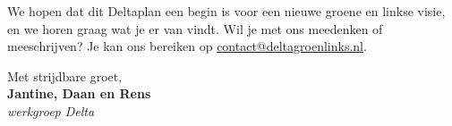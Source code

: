 \begin{multicols}{2}
We hopen dat dit Deltaplan een begin is voor een nieuwe groene en linkse visie, en we horen graag wat je er van vindt.
Wil je met ons meedenken of meeschrijven? Je kan ons bereiken op \href{mailto:contact@deltagroenlinks.nl}{contact@deltagroenlinks.nl}.

\end{multicols}

\begin{centering}
Met strijdbare groet,\\
\textbf{Jantine, Daan en Rens}\\
\textit{werkgroep Delta}

\end{centering}
